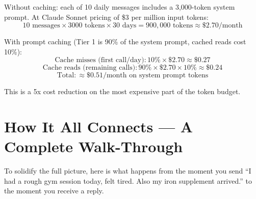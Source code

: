 \documentclass[12pt, a4paper]{article}
\begin{document}
Without caching: each of 10 daily messages includes a 3,000-token system prompt. At Claude Sonnet pricing of \$3 per million input tokens:
$$10 \text{ messages} \times 3000 \text{ tokens} \times 30 \text{ days} = 900{,}000 \text{ tokens} \approx \$2.70/\text{month}$$

With prompt caching (Tier 1 is 90\% of the system prompt, cached reads cost 10\%):
$$\text{Cache misses (first call/day)}: 10\% \times \$2.70 \approx \$0.27$$
$$\text{Cache reads (remaining calls)}: 90\% \times \$2.70 \times 10\% \approx \$0.24$$
$$\text{Total}: \approx \$0.51/\text{month on system prompt tokens}$$

This is a 5x cost reduction on the most expensive part of the token budget.

\section{How It All Connects --- A Complete Walk-Through}

To solidify the full picture, here is what happens from the moment you send ``I had a rough gym session today, felt tired. Also my iron supplement arrived.'' to the moment you receive a reply.
\end{document}
